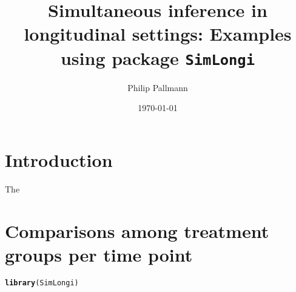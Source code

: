 \documentclass[a4paper]{article}\usepackage[]{graphicx}\usepackage[]{color}
\title{Simultaneous inference in longitudinal settings: Examples using package \texttt{SimLongi}}
\date{\today}
\author{Philip Pallmann}
\makeatletter
\newcommand{\hlstd}[1]{\textcolor[rgb]{0.345,0.345,0.345}{#1}}%
\newcommand{\hlkwd}[1]{\textcolor[rgb]{0.737,0.353,0.396}{\textbf{#1}}}%
\newenvironment{kframe}{%
 \def\at@end@of@kframe{}%
 \ifinner\ifhmode%
  \def\at@end@of@kframe{\end{minipage}}%
  \begin{minipage}{\columnwidth}%
 \fi\fi%
 \def\FrameCommand##1{\hskip\@totalleftmargin \hskip-\fboxsep
 \colorbox{shadecolor}{##1}\hskip-\fboxsep
     \hskip-\linewidth \hskip-\@totalleftmargin \hskip\columnwidth}%
 \MakeFramed {\advance\hsize-\width
   \@totalleftmargin\z@ \linewidth\hsize
   \@setminipage}}%
 {\par\unskip\endMakeFramed%
 \at@end@of@kframe}
\newenvironment{knitrout}{}{} %
\makeatother
\begin{document}
\maketitle

\tableofcontents


\section{Introduction}
\label{Intro}

The 

\clearpage


\section{Comparisons among treatment groups per time point}
\label{GPT}

\begin{knitrout}
\color{fgcolor}\begin{kframe}
\begin{alltt}
\hlkwd{library}\hlstd{(SimLongi)}
\end{alltt}
\end{kframe}
\end{knitrout}


\clearpage

\end{document}

